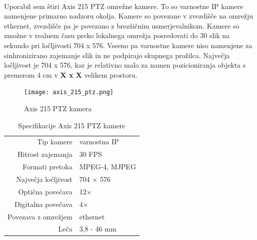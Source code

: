 \documentclass[a4paper, 12pt]{book}
\begin{document}
 \\
Uporabil sem štiri Axis 215 PTZ omrežne kamere. To so varnostne IP kamere namenjene primarno nadzoru okolja. Kamere so povezane v zvezdišče na omrežju ethernet, zvezdišče pa je povezano z brezžičnim usmerjevalnikom.  Kamere so zmožne v realnem času preko lokalnega omrežja posredovati do 30 slik na sekundo pri ločljivosti 704 x 576. Vseeno pa varnostne kamere niso namenjene za sinhronizirano zajemanje slik in ne podpirajo skupnega prožilca. Največja ločljivost je 704 x 576, kar je relativno malo za namen pozicioniranja objekta s premerom 4 cm v \textbf{X x X} velikem prostoru.
\begin{figure}[H]
\centering
\texttt{[image: axis\_215\_ptz.png]}
\caption{Axis 215 PTZ kamera}
\end{figure}

\begin{table}[H]
\centering
\begin{tabular}{| r | l |}
\hline
Tip kamere & varnostna IP \\
Hitrost zajemanja & 30 FPS \\
Formati pretoka & MPEG-4, MJPEG \\
Največja ločljivost & 704 $\times$ 576 \\
Optična povečava & 12$\times$ \\
Digitalna povečava & 4$\times$ \\
Povezava z omrežjem & ethernet \\
Leča & 3,8 - 46 mm \\
\hline
\end{tabular}
\caption{Specifikacije Axis 215 PTZ kamere}
\end{table}
\end{document}
